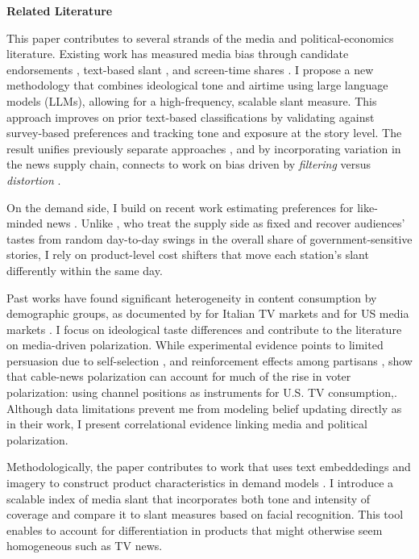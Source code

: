 \documentclass[12pt]{article}
\begin{document}
\textbf{Related Literature}


This paper contributes to several strands of the media and political-economics literature. Existing work has measured media bias through candidate endorsements \citep{ChiangKnight2011}, text-based slant \citep{gentzkow2010media,GentzkowShapiroTaddy2019}, and screen-time shares \citep{durante2012partisan,CageHengelHerveUrvoy2022}. I propose a new methodology that combines ideological tone and airtime using large language models (LLMs), allowing for a high-frequency, scalable slant measure. This approach improves on prior text-based classifications by validating against survey-based preferences and tracking tone and exposure at the story level. The result unifies previously separate approaches \citep{puglisi_review}, and by incorporating variation in the news supply chain, connects to work on bias driven by \emph{filtering} versus \emph{distortion} \citep{gentzkow2014media}.


On the demand side, I build on recent work estimating preferences for like-minded news \citep{SimonovRao2022,gentzkow2010media}. Unlike \cite{SimonovRao2022}, who treat the supply side as fixed and recover audiences’ tastes from random day-to-day swings in the overall share of government-sensitive stories, I  rely on product-level cost shifters that move each station’s slant differently within the same day. 


Past works have found significant heterogeneity in content consumption by demographic groups, as documented by \citet{gambaro2021revealed} for Italian TV markets and for US media markets \citep{bang2023, BangSieg2025}. I focus on ideological taste differences and contribute to the literature on media-driven polarization. While experimental evidence points to limited persuasion due to self-selection \citep{arceneaux_johnson_2013}, and reinforcement effects among partisans \citep{levendusky}, \citet{martin2017} show that cable-news polarization can account for much of the rise in voter polarization: using channel positions as instruments for U.S. TV consumption,. Although data limitations prevent me from modeling belief updating directly as in their work, I present correlational evidence linking media and political polarization.

Methodologically, the paper contributes to work that uses text embeddedings  and imagery to construct product characteristics in demand models \citep{compiani2025demandestimationtextimage}. I introduce a scalable index of media slant that incorporates both tone and intensity of coverage and compare it to slant measures based on facial recognition. This tool enables to account for differentiation in products that might otherwise seem homogeneous such as TV news. 
\end{document}
